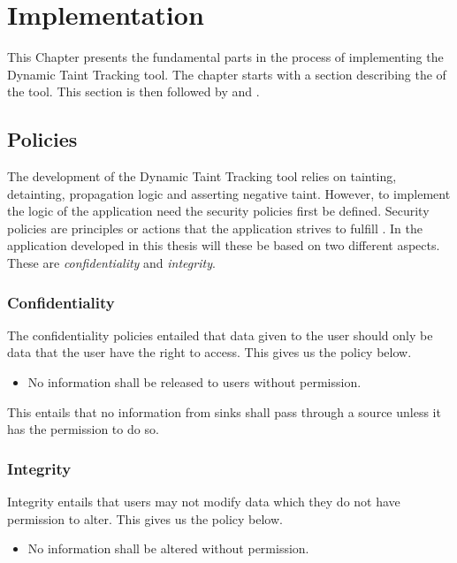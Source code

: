 \chapter{Implementation}
This Chapter presents the fundamental parts in the process of implementing the Dynamic Taint Tracking tool. The chapter starts with a section describing the \textit{} of the tool. This section is then followed by \textit{} and \textit{}.



\section{Policies}
\label{Policies}
The development of the Dynamic Taint Tracking tool relies on tainting, detainting, propagation logic and asserting negative taint. However, to implement the logic of the application need the security policies first be defined. Security policies are principles or actions that the application strives to fulfill \parencite{BayukJenniferL2012Cspg}. In the application developed in this thesis will these be based on two different aspects. These are \textit{confidentiality} and \textit{integrity}.



\subsection{Confidentiality}
The confidentiality policies entailed that data given to the user should only be data that the user have the right to access. This gives us the policy below.

\hfill
\begin{itemize}
    \item No information shall be released to users without permission.
\end{itemize}
\hfill

This entails that no information from sinks shall pass through a source unless it has the permission to do so.



\subsection{Integrity}
Integrity entails that users may not modify data which they do not have permission to alter. This gives us the policy below.

\hfill
\begin{itemize}
    \item No information shall be altered without permission.
\end{itemize}
\hfill

